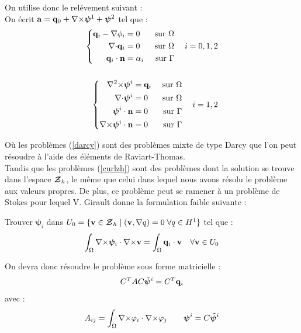 \documentclass[a4paper,11pt]{article}
\begin{document}
On utilise donc le relévement suivant :\\
On écrit ${\mathbf{a}} = {\mathbf{q}}_0 + {\nabla\times}\bm{\psi}^1 + \bm{\psi}^2$ tel que :
\begin{align}
  \left\{
  \begin{aligned}
    {\mathbf{q}}_i - {\nabla}{\phi}_i &= 0 &\mbox{ sur }\Omega\\
    {\nabla\cdot}{\mathbf{q}}_i &= 0 &\mbox{ sur }\Omega\\
    {\mathbf{q}}_i\cdot{\mathbf{n}} &= \alpha_i &\mbox{ sur }\Gamma
  \end{aligned}
  \right.\quad i=0,1,2\label{darcy}\\
  \nonumber\\
  \left\{
  \begin{aligned}
    {\nabla^2\times}\bm{\psi}^i &= {\mathbf{q}}_i &\mbox{ sur }\Omega\\
    {\nabla\cdot}\bm{\psi}^i &= 0 &\mbox{ sur }\Omega\\
    \bm{\psi}^i\cdot{\mathbf{n}} &= 0 &\mbox{ sur }\Gamma\\
    {\nabla\times}\bm{\psi}^i\cdot{\mathbf{n}} &= 0 &\mbox{ sur }\Gamma
  \end{aligned}
  \right.\quad i=1,2\label{curlzh}
\end{align}

Où les problèmes (\ref{darcy}) sont des problèmes mixte de type Darcy que l'on peut résoudre à l'aide des éléments de Raviart-Thomas.\\
Tandis que les problèmes (\ref{curlzh}) sont des problèmes dont la solution se trouve dans l'espace ${\bm{\mathcal{Z}}}_h$, le même que celui dans lequel nous avons résolu le problème aux valeurs propres. De plus, ce problème peut se ramener à un problème de Stokes pour lequel V. Girault donne la formulation faible suivante :
\begin{pb}
  Trouver $\bm{\psi}_i$ dans $U_0=\{{\mathbf{v}}\in{\bm{\mathcal{Z}}}_h\;|\; ({\mathbf{v}},{\nabla} q) = 0\; \forall q\in H^1\}$ tel que :
  \begin{equation*}
    \int_\Omega {\nabla\times}\bm{\psi}_i\cdot{\nabla\times} {\mathbf{v}} = \int_\Omega {\mathbf{q}}_i\cdot{\mathbf{v}}\quad\forall{\mathbf{v}}\in U_0
  \end{equation*}
\end{pb}

On devra donc résoudre le problème sous forme matricielle :
\begin{equation}
  C^TAC\tilde{\bm{\psi}}^i = C^T{\mathbf{q}}_i
\end{equation}
avec :
\[ A_{ij} = \int_\Omega {\nabla\times}\varphi_i\cdot{\nabla\times}\varphi_j\quad\quad \bm{\psi}^i = C\tilde{\bm{\psi}}^i \]
\end{document}
